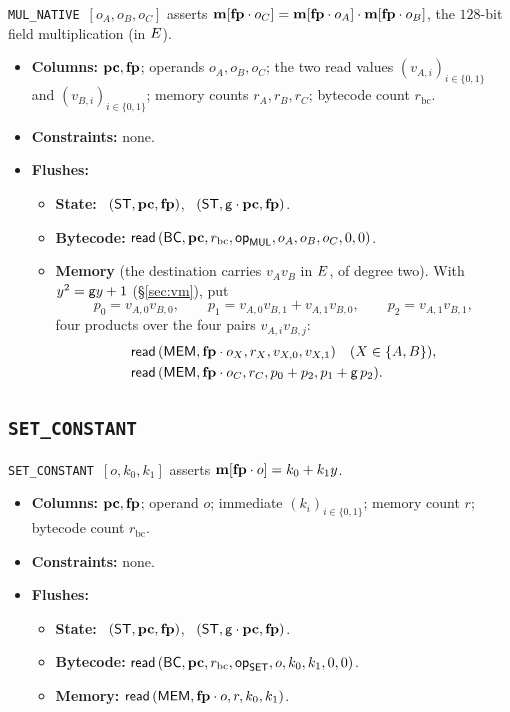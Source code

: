 \texttt{MUL\_NATIVE}\ $[o_A,o_B,o_C]$ asserts $\mathbf{m}[\mathbf{fp}\cdot o_C]=\mathbf{m}[\mathbf{fp}\cdot o_A] \cdot \mathbf{m}[\mathbf{fp}\cdot o_B]$, the $128$-bit field multiplication (in $E$).
\begin{itemize}
\item \textbf{Columns:} $\mathbf{pc},\mathbf{fp}$; operands $o_A,o_B,o_C$; the two read values $(v_{A,i})_{i\in\{0,1\}}$ and $(v_{B,i})_{i\in\{0,1\}}$; memory counts $r_A,r_B,r_C$; bytecode count $r_{\mathrm{bc}}$.
\item \textbf{Constraints:} none.
\item \textbf{Flushes:}
  \begin{itemize}
  \item \textbf{State:} \pull\ $( \mathsf{ST},\mathbf{pc},\mathbf{fp} )$, \push\ $( \mathsf{ST},\mathsf{g}\cdot\mathbf{pc},\mathbf{fp} )$.
  \item \textbf{Bytecode:} $\mathsf{read}\,( \mathsf{BC},\mathbf{pc},r_{\mathrm{bc}},\mathsf{op}_{\mathsf{MUL}},o_A,o_B,o_C,0,0 )$.
  \item \textbf{Memory} (the destination carries $v_Av_B$ in $E$, of degree two). With $y^2=\mathsf{g} y+1$ (\S\ref{sec:vm}), put
    \[
    p_0=v_{A,0}v_{B,0},\qquad
    p_1=v_{A,0}v_{B,1}+v_{A,1}v_{B,0},\qquad
    p_2=v_{A,1}v_{B,1},
    \]
    four products over the four pairs $v_{A,i}v_{B,j}$:
    \begin{align*}
      &\mathsf{read}\,( \mathsf{MEM},\mathbf{fp}\cdot o_X,r_X,v_{X,0},v_{X,1} )\quad(X\in\{A,B\}),\\
      &\mathsf{read}\,( \mathsf{MEM},\mathbf{fp}\cdot o_C,r_C,p_0+p_2,p_1+\mathsf{g}\,p_2 ).
    \end{align*}
  \end{itemize}
\end{itemize}

\subsection{\texttt{SET\_CONSTANT}}\label{sec:tab-set}

\texttt{SET\_CONSTANT}\ $[o,k_0,k_1]$ asserts $\mathbf{m}[\mathbf{fp}\cdot o]=k_0+k_1y$.
\begin{itemize}
\item \textbf{Columns:} $\mathbf{pc},\mathbf{fp}$; operand $o$; immediate $(k_i)_{i\in\{0,1\}}$; memory count $r$; bytecode count $r_{\mathrm{bc}}$.
\item \textbf{Constraints:} none.
\item \textbf{Flushes:}
  \begin{itemize}
  \item \textbf{State:} \pull\ $( \mathsf{ST},\mathbf{pc},\mathbf{fp} )$, \push\ $( \mathsf{ST},\mathsf{g}\cdot\mathbf{pc},\mathbf{fp} )$.
  \item \textbf{Bytecode:} $\mathsf{read}\,( \mathsf{BC},\mathbf{pc},r_{\mathrm{bc}},\mathsf{op}_{\mathsf{SET}},o,k_0,k_1,0,0 )$.
  \item \textbf{Memory:} $\mathsf{read}\,( \mathsf{MEM},\mathbf{fp}\cdot o,r,k_0,k_1 )$.
  \end{itemize}
\end{itemize}

